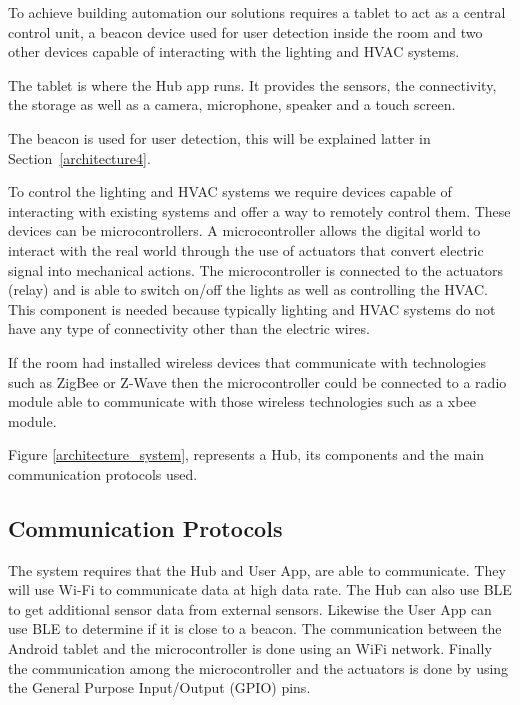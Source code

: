 To achieve building automation our solutions requires a tablet to act as a central control unit, a beacon device used for user detection inside the room and two other devices capable of interacting with the lighting and \ac{HVAC} systems.

The tablet is where the Hub app runs. It provides the sensors, the connectivity, the storage as well as a camera, microphone, speaker and a touch screen. 

The beacon is used for user detection, this will be explained latter in Section~\ref{architecture4}.

To control the lighting and \ac{HVAC} systems we require devices capable of interacting with existing systems and offer a way to remotely control them. These devices can be microcontrollers. A microcontroller allows the digital world to interact with the real world through the use of actuators that convert electric signal into mechanical actions. The microcontroller is connected to the actuators (relay) and is able to switch on/off the lights as well as controlling the HVAC. This component is needed because typically lighting and HVAC systems do not have any type of connectivity other than the electric wires. 


If the room had installed wireless devices that communicate with technologies such as ZigBee or Z-Wave then the microcontroller could be connected to a radio module able to communicate with those wireless technologies such as a xbee module.


Figure \ref{architecture_system}, represents a Hub, its components and the main communication protocols used.

 

\subsection{Communication Protocols}

The system requires that the Hub and User App, are able to communicate. They will use Wi-Fi to communicate data at high data rate. The Hub can also use \ac{BLE} to get additional sensor data from external sensors. Likewise the User App can use \ac{BLE} to determine if it is close to a beacon. The communication between the Android tablet and the microcontroller is done using an WiFi network. Finally the communication among the microcontroller and the actuators is done by using the General Purpose Input/Output (GPIO) pins.




